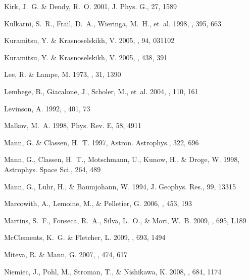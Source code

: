 \documentclass[structabstract]{aa}
\begin{document}
\begin{thebibliography}{71}
Kirk, J.~G. \& Dendy, R.~O. 2001, J. Phys. G., 27, 1589

Kulkarni, S.~R., Frail, D.~A., Wieringa, M.~H., {et~al.} 1998, \nat, 395, 663

Kuramitsu, Y. \& Krasnoselskikh, V. 2005{}, \prl, 94, 031102

Kuramitsu, Y. \& Krasnoselskikh, V. 2005{}, \aap, 438, 391

Lee, R. \& Lampe, M. 1973, \prl, 31, 1390

Lembege, B., Giacalone, J., Scholer, M., {et~al.} 2004, \ssr, 110, 161

Levinson, A. 1992, \apj, 401, 73

Malkov, M.~A. 1998, Phys. Rev. E, 58, 4911

Mann, G. \& Classen, H.~T. 1997, Astron. Astrophys., 322, 696

Mann, G., Classen, H.~T., Motschmann, U., Kunow, H., \& Droge, W. 1998,
  Astrophys. Space Sci., 264, 489

Mann, G., Luhr, H., \& Baumjohann, W. 1994, J. Geophys. Res., 99, 13315

Marcowith, A., Lemoine, M., \& Pelletier, G. 2006, \aap, 453, 193

Martins, S.~F., Fonseca, R.~A., Silva, L.~O., \& Mori, W.~B. 2009, \apjl, 695,
  L189

McClements, K.~G. \& Fletcher, L. 2009, \apj, 693, 1494

Miteva, R. \& Mann, G. 2007, \aap, 474, 617

Niemiec, J., Pohl, M., Stroman, T., \& Nishikawa, K. 2008, \apj, 684, 1174


\end{thebibliography}
\end{document}
